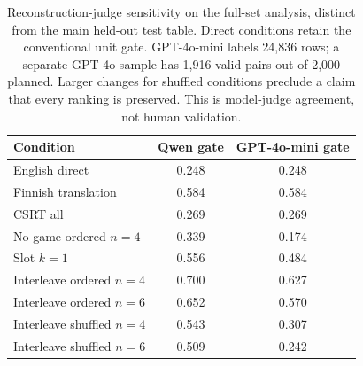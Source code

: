 \begin{table}[t]\centering
\small
\setlength{\tabcolsep}{3.5pt}
\caption{Reconstruction-judge sensitivity on the full-set analysis, distinct from the main held-out test table. Direct conditions retain the conventional unit gate. GPT-4o-mini labels 24,836 rows; a separate GPT-4o sample has 1,916 valid pairs out of 2,000 planned. Larger changes for shuffled conditions preclude a claim that every ranking is preserved. This is model-judge agreement, not human validation.}
\label{tab:gateval}
\begin{tabular}{l cc}\toprule
Condition & Qwen gate & GPT-4o-mini gate \\\midrule
English direct & 0.248 & 0.248 \\
Finnish translation & 0.584 & 0.584 \\
CSRT all & 0.269 & 0.269 \\
No-game ordered $n=4$ & 0.339 & 0.174 \\
Slot $k=1$ & 0.556 & 0.484 \\
Interleave ordered $n=4$ & 0.700 & 0.627 \\
Interleave ordered $n=6$ & 0.652 & 0.570 \\
Interleave shuffled $n=4$ & 0.543 & 0.307 \\
Interleave shuffled $n=6$ & 0.509 & 0.242 \\
\bottomrule\end{tabular}\end{table}
